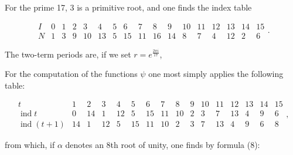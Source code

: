 
For the prime 17, 3 is a primitive root, and one finds
the index table

\[
\begin{array}{c|cccccccccccccccc}
I & 0 & 1 & 2 & 3 & 4 & 5 & 6 & 7 & 8 & 9 & 10 & 11 & 12 & 13 & 14 & 15\\
\hline
N & 1 & 3 & 9 & 10 & 13 & 5 & 15 & 11 & 16 & 14 & 8 & 7 & 4 & 12 & 2 & 6
\end{array}
.
\]

The two-term periods are, if we set $r = e^{\frac{2\pi i}{17}}$,


For the computation of the functions $\psi$ one most simply
applies the following table:

\[
\begin{array}{r|ccccccccccccccc}
t & 1 & 2 & 3 & 4 & 5 & 6 & 7 & 8 & 9 & 10 & 11 & 12 & 13 & 14 & 15\\
\hline
\operatorname{ind} t & 0 & 14 & 1 & 12 & 5 & 15 & 11 & 10 & 2 & 3 & 7 & 13 & 4 & 9 & 6 \\
\hline
\operatorname{ind}(t+1) & 14 & 1 & 12 & 5 & 15 & 11 & 10 & 2 & 3 & 7 & 13 & 4 & 9 & 6 & 8
\end{array}
,
\]

from which, if $\alpha$ denotes an 8th root of unity, one finds by
formula (8):


